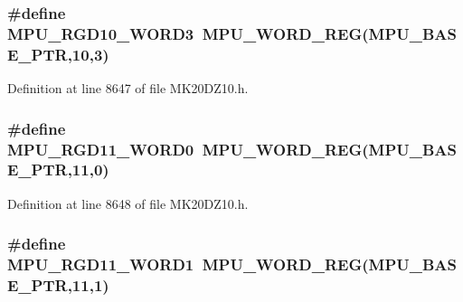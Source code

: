 \subsubsection[{\texorpdfstring{M\+P\+U\+\_\+\+R\+G\+D10\+\_\+\+W\+O\+R\+D3}{MPU_RGD10_WORD3}}]{\setlength{\rightskip}{0pt plus 5cm}\#define M\+P\+U\+\_\+\+R\+G\+D10\+\_\+\+W\+O\+R\+D3~{\bf M\+P\+U\+\_\+\+W\+O\+R\+D\+\_\+\+R\+EG}({\bf M\+P\+U\+\_\+\+B\+A\+S\+E\+\_\+\+P\+TR},10,3)}\hypertarget{group___m_p_u___register___accessor___macros_ga1d3aa87e2dc136a6a93c84874093c013}{}\label{group___m_p_u___register___accessor___macros_ga1d3aa87e2dc136a6a93c84874093c013}


Definition at line 8647 of file M\+K20\+D\+Z10.\+h.

\subsubsection[{\texorpdfstring{M\+P\+U\+\_\+\+R\+G\+D11\+\_\+\+W\+O\+R\+D0}{MPU_RGD11_WORD0}}]{\setlength{\rightskip}{0pt plus 5cm}\#define M\+P\+U\+\_\+\+R\+G\+D11\+\_\+\+W\+O\+R\+D0~{\bf M\+P\+U\+\_\+\+W\+O\+R\+D\+\_\+\+R\+EG}({\bf M\+P\+U\+\_\+\+B\+A\+S\+E\+\_\+\+P\+TR},11,0)}\hypertarget{group___m_p_u___register___accessor___macros_gacf3b36d8188270dcf2409cdebd061d6a}{}\label{group___m_p_u___register___accessor___macros_gacf3b36d8188270dcf2409cdebd061d6a}


Definition at line 8648 of file M\+K20\+D\+Z10.\+h.

\subsubsection[{\texorpdfstring{M\+P\+U\+\_\+\+R\+G\+D11\+\_\+\+W\+O\+R\+D1}{MPU_RGD11_WORD1}}]{\setlength{\rightskip}{0pt plus 5cm}\#define M\+P\+U\+\_\+\+R\+G\+D11\+\_\+\+W\+O\+R\+D1~{\bf M\+P\+U\+\_\+\+W\+O\+R\+D\+\_\+\+R\+EG}({\bf M\+P\+U\+\_\+\+B\+A\+S\+E\+\_\+\+P\+TR},11,1)}\hypertarget{group___m_p_u___register___accessor___macros_gaf3c09ad359359a3504efdd0320f16647}{}\label{group___m_p_u___register___accessor___macros_gaf3c09ad359359a3504efdd0320f16647}


